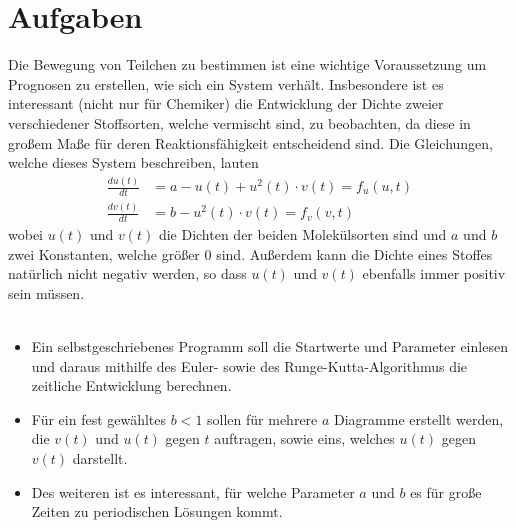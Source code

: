 \documentclass[12pt,a4paper,titlepage,headinclude,bibtotoc]{scrartcl}
\begin{document}
\section{Aufgaben}
Die Bewegung von Teilchen zu bestimmen ist eine wichtige Voraussetzung um Prognosen zu erstellen, wie sich ein System verhält.
Insbesondere ist es interessant (nicht nur für Chemiker) die Entwicklung der Dichte zweier verschiedener Stoffsorten, welche vermischt sind, zu beobachten, da diese in großem Maße für deren Reaktionsfähigkeit entscheidend sind.
Die Gleichungen, welche dieses System beschreiben, lauten
\begin{align}
\frac{du(t)}{dt}&=a-u(t)+u^2(t)\cdot v(t)=f_u(u,t)\\
\frac{dv(t)}{dt}&=b-u^2(t)\cdot v(t)=f_v(v,t)
\end{align}
wobei $u(t)$ und $v(t)$ die Dichten der beiden Molekülsorten sind und $a$ und $b$ zwei Konstanten, welche größer 0 sind. Außerdem kann die Dichte eines Stoffes natürlich nicht negativ werden, so dass $u(t)$ und $v(t)$ ebenfalls immer positiv sein müssen.\\\\
\begin{itemize}
	\item Ein selbstgeschriebenes Programm soll die Startwerte und Parameter einlesen und daraus mithilfe des Euler- sowie des Runge-Kutta-Algorithmus die zeitliche Entwicklung berechnen.
	\item Für ein fest gewähltes $b<1$ sollen für mehrere $a$ Diagramme erstellt werden, die $v(t)$ und $u(t)$ gegen $t$ auftragen, sowie eins, welches $u(t)$ gegen $v(t)$ darstellt.
	\item Des weiteren ist es interessant, für welche Parameter $a$ und $b$ es für große Zeiten zu periodischen Lösungen kommt.
\end{itemize}
\end{document}
